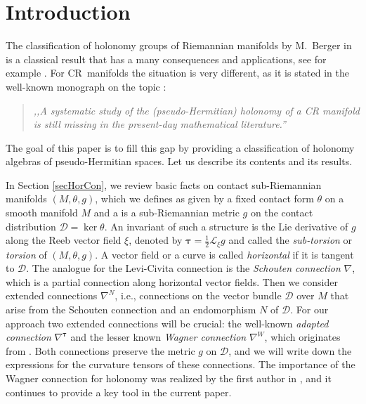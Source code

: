 \documentclass{amsart}
\theoremstyle{plain}
\theoremstyle{definition}
\newcommand{\bt}{{\boldsymbol{\tau}}}
\newcommand{\1}{\mathbf{1}}
\newcommand{\D}{{\mathcal D}}
\newcommand{\+}{\oplus}
\begin{document}
	
	\maketitle
	
\setcounter{tocdepth}{1}	
\tableofcontents



\section{Introduction}
The classification of holonomy groups of Riemannian manifolds by M.~Berger in \cite{berger55} is a classical result that has a many consequences and applications, see for example  \cite{Besse,Bryant92,bryant99,Joyce07}.
For CR~manifolds the situation is very different, as it is stated  in the well-known monograph  on the topic \cite[p. 330]{DT2006}:
\begin{quote}
	{\it ,,A systematic study of the (pseudo-Hermitian) holonomy of a CR manifold is still missing in the present-day mathematical literature.''}\end{quote}
The goal of this paper is to fill this gap by providing a classification of holonomy algebras of pseudo-Hermitian spaces. Let us describe its contents and its  results. 

In Section \ref{secHorCon}, we review basic facts on  contact sub-Riemannian manifolds $(M,\theta,g)$, which we defines as given by  a fixed contact form  $\theta$ on a smooth manifold $M$ and a is a sub-Riemannian metric  $g$ on the contact distribution $\D=\ker\theta$. An invariant of such a structure is the Lie derivative of $g$ along the Reeb vector field $\xi$, denoted by $\bt=\frac{1}{2}\mathcal L_\xi g$ and called the {\em sub-torsion} or {\em torsion} of $(M,\theta,g)$.
A vector field or a curve is called {\em horizontal} if it is tangent to $\D$.
The analogue for the Levi-Civita connection is the {\em Schouten connection} $\nabla$, which is a partial connection along horizontal vector fields.  Then we consider extended connections $\nabla^N$, i.e., connections on the vector bundle $\D$ over $M$ that arise from the Schouten connection and an endomorphism $N$ of $\D$. For our approach two extended connections will be crucial: the well-known {\em adapted connection} $\nabla^\bt$ and the lesser known {\em Wagner connection} $\nabla^W$,  which originates from \cite{Wagner41}. 
Both connections preserve the metric $g$ on $\D$, and we will write down the expressions for the curvature tensors of these connections. 
The importance of the Wagner connection for holonomy was realized by the first author  in \cite{GalHolK}, and it continues to provide a key tool in the current paper. 
\end{document}
